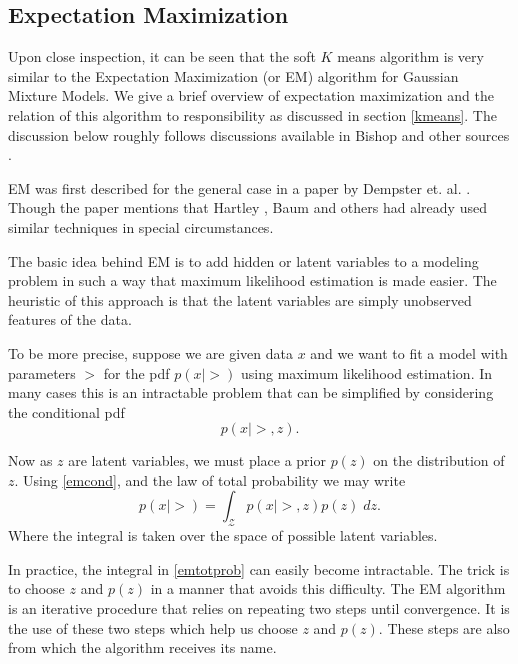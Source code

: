 
\subsection{Expectation Maximization} \label{emAlg}
Upon close inspection, it can be seen that the soft \(K\) means algorithm is 
very similar to the Expectation Maximization (or EM) algorithm for Gaussian 
Mixture Models.  We give a brief overview of expectation maximization
and the relation of this algorithm to responsibility as discussed in section 
\ref{kmeans}. The discussion below roughly follows discussions available in 
Bishop and other sources \cite{MML_2019, BishopBook, hastie09esl}.

EM was first described for the general case in a paper by Dempster et. al. \cite{Dempster77EM}.  
Though the paper mentions that Hartley \cite{hartley1958}, Baum \cite{baum1970} and others \cite{woodbury1970missing,sundberg1974,sundberg1976}
had already used similar techniques in special circumstances.

The basic idea behind EM is to add hidden or latent variables to a modeling
problem in such a way that maximum likelihood estimation is made easier.  The 
heuristic of this approach is that the latent variables are simply unobserved 
features of the data.  

To be more precise, suppose we are given data $ x $ and we want to fit a model 
with parameters $ \gt $ for the pdf \( p(x|\gt) \) using maximum likelihood 
estimation. In many cases this is an intractable problem that can be simplified
by considering the conditional pdf
\begin{equation}\label{emcond}	
p(x|\gt,z).
\end{equation}

Now as \( z \) are latent variables, we must place a prior \( p(z) \) on the 
distribution of \( z. \) Using \ref{emcond}, and the law of total probability 
we may write
\begin{equation}\label{emtotprob}
p(x|\gt)=\int_{\mathcal{Z}} p(x|\gt,z)p(z)\;dz.
\end{equation}
Where the integral is taken over the space of possible latent variables.

In practice, the integral in \ref{emtotprob} can easily become intractable.  The trick is
to choose \( z \) and \( p(z) \) in a manner that avoids this difficulty. 
The EM algorithm is an iterative procedure that relies on repeating two steps until convergence.  It is the use of these two steps which help us choose \( z \) and \( p(z) \). These steps are also from which the algorithm receives its name.  

